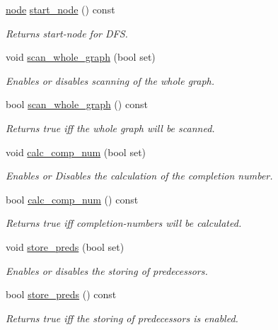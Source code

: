 \begin{DoxyCompactItemize}
\mbox{\hyperlink{classnode}{node}} \mbox{\hyperlink{classdfs_a7688d8eaf1308438820fec2ffe21257c}{start\+\_\+node}} () const
\begin{DoxyCompactList}\small\item\em Returns start-\/node for D\+FS. \end{DoxyCompactList}\item 
void \mbox{\hyperlink{classdfs_aa7c864a6f3a120720138b187b3ed95b5}{scan\+\_\+whole\+\_\+graph}} (bool set)
\begin{DoxyCompactList}\small\item\em Enables or disables scanning of the whole graph. \end{DoxyCompactList}\item 
bool \mbox{\hyperlink{classdfs_a025ed2d6101a7b9f72578a52b484ef50}{scan\+\_\+whole\+\_\+graph}} () const
\begin{DoxyCompactList}\small\item\em Returns true iff the whole graph will be scanned. \end{DoxyCompactList}\item 
void \mbox{\hyperlink{classdfs_a70862ea715c52eb95fb704afd3a6e676}{calc\+\_\+comp\+\_\+num}} (bool set)
\begin{DoxyCompactList}\small\item\em Enables or Disables the calculation of the completion number. \end{DoxyCompactList}\item 
bool \mbox{\hyperlink{classdfs_aba80ac24a78448f10b32473633cd2a5d}{calc\+\_\+comp\+\_\+num}} () const
\begin{DoxyCompactList}\small\item\em Returns true iff completion-\/numbers will be calculated. \end{DoxyCompactList}\item 
void \mbox{\hyperlink{classdfs_a7043f46eb3887cbcbb1391fc783407a4}{store\+\_\+preds}} (bool set)
\begin{DoxyCompactList}\small\item\em Enables or disables the storing of predecessors. \end{DoxyCompactList}\item 
bool \mbox{\hyperlink{classdfs_ad0233128f2958d630102096aa6f3b9ef}{store\+\_\+preds}} () const
\begin{DoxyCompactList}\small\item\em Returns true iff the storing of predecessors is enabled. \end{DoxyCompactList}\item 

\end{DoxyCompactItemize}

